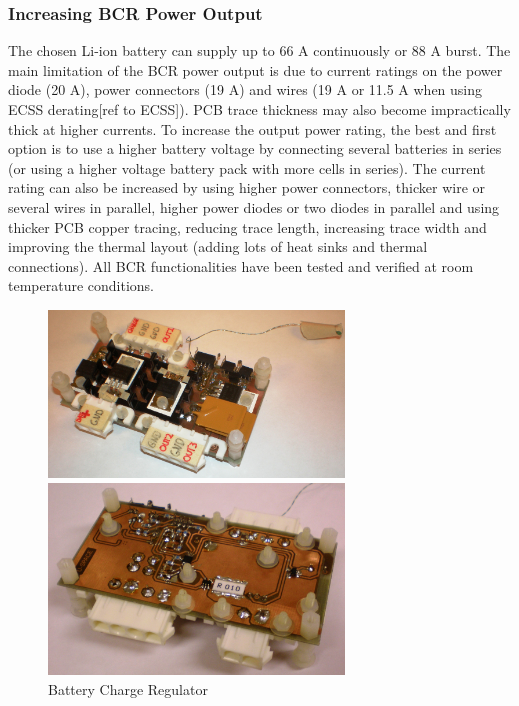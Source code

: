 \subsubsection*{Increasing BCR Power Output}
The chosen Li-ion battery can supply up to 66 A continuously or 88 A burst. The main limitation of the \ac{BCR} power output is due to current ratings on the power diode (20 A), power connectors (19 A) and wires (19 A or 11.5 A when using ECSS derating[ref to ECSS]). PCB trace thickness may also become impractically thick at higher currents. 
To increase the output power rating, the best and first option is to use a higher battery voltage by connecting several batteries in series (or using a higher voltage battery pack with more cells in series). 
The current rating can also be increased by using higher power connectors, thicker wire or several wires in parallel, higher power diodes or two diodes in parallel and using thicker PCB copper tracing, reducing trace length, increasing trace width and improving the thermal layout (adding lots of heat sinks and thermal connections).
%
%
All \ac{BCR} functionalities have been tested and verified at room temperature conditions.
%
\begin{figure}[H]
\begin{minipage}[t]{\linewidth}
\centering
\includegraphics[width=0.7\textwidth]{figures/fig_BCR_top}
\end{minipage}
\vspace{2mm}
\begin{minipage}[t]{\linewidth}
\centering
\includegraphics[width=0.7\textwidth]{figures/fig_BCR_bottom}
\end{minipage}
\caption{Battery Charge Regulator}
\label{fig:BCR_top_bottom}
\end{figure}
